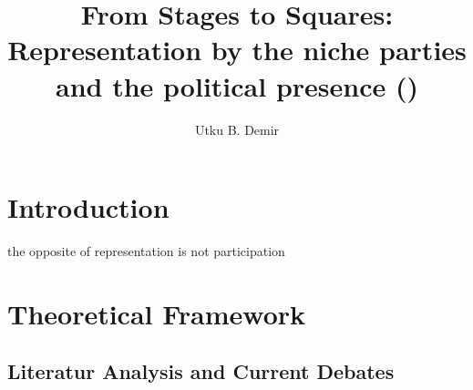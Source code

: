 
\usepackage{tcolorbox}
\title{From Stages to Squares: Representation by the niche parties and the
political presence ()}
\author{Utku B. Demir}


\maketitle

\chapter{Introduction}\label{chap:Introduction} %
\epigraph{the opposite of representation is not participation}{\cite[19]{plotke1997}}


\chapter{Theoretical Framework}\label{chap:Theoretical Framework and Current Debates} %

\section{Literatur Analysis and Current Debates}\label{chap:Literatur Analysis} %

